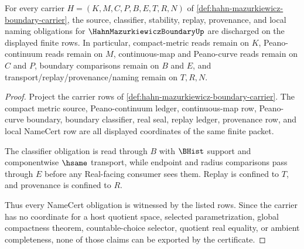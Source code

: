 \begin{theorem}
\label{thm:hahn-mazurkiewicz-boundary-namecert-obligations}
For every carrier $H=(K,M,C,P,B,E,T,R,N)$ of \autoref{def:hahn-mazurkiewicz-boundary-carrier}, the source, classifier, stability, replay, provenance, and local naming obligations for $\HahnMazurkiewiczBoundaryUp$ are discharged on the displayed finite rows. In particular, compact-metric reads remain on $K$, Peano-continuum reads remain on $M$, continuous-map and Peano-curve reads remain on $C$ and $P$, boundary comparisons remain on $B$ and $E$, and transport/replay/provenance/naming remain on $T,R,N$.
\end{theorem}
\begin{proof}
Project the carrier rows of \autoref{def:hahn-mazurkiewicz-boundary-carrier}. The compact metric source, Peano-continuum ledger, continuous-map row, Peano-curve boundary, boundary classifier, real seal, replay ledger, provenance row, and local NameCert row are all displayed coordinates of the same finite packet.

The classifier obligation is read through $B$ with $\BHist$ support and componentwise $\hsame$ transport, while endpoint and radius comparisons pass through $E$ before any Real-facing consumer sees them. Replay is confined to $T$, and provenance is confined to $R$.

Thus every NameCert obligation is witnessed by the listed rows. Since the carrier has no coordinate for a host quotient space, selected parametrization, global compactness theorem, countable-choice selector, quotient real equality, or ambient completeness, none of those claims can be exported by the certificate.
\end{proof}

